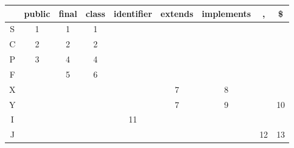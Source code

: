 \documentclass{article}
\begin{document}
\begin{enumerate}[i.]
		\begin{tabular}{|c|c|c|c|c|c|c|c|c|}
			                                                                            \hline
			  & public & final & class & identifier & extends & implements &  , & \$ \\ \hline
			S &    1   &   1   &   1   &            &         &            &    &    \\ \hline
			C &    2   &   2   &   2   &            &         &            &    &    \\ \hline
			P &    3   &   4   &   4   &            &         &            &    &    \\ \hline
			F &        &   5   &   6   &            &         &            &    &    \\ \hline
			X &        &       &       &            &    7    &      8     &    &    \\ \hline
			Y &        &       &       &            &    7    &      9     &    & 10 \\ \hline
			I &        &       &       &     11     &         &            &    &    \\ \hline
			J &        &       &       &            &         &            & 12 & 13 \\ \hline
		\end{tabular}
\end{enumerate}
\end{document}
